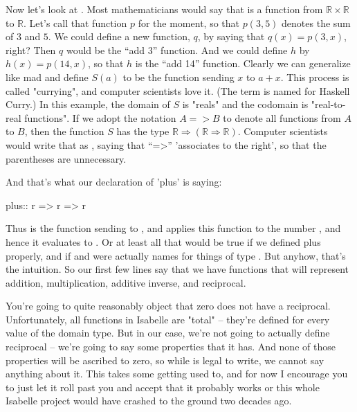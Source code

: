 Now let's look at . Most mathematicians would say that  is a function from $\mathbb R \times \mathbb R$ to $\mathbb R$.  Let's call that function $p$ for the moment, so that $p(3, 5)$ denotes the sum of $3$ and $5$. We could define a new function, $q$, by saying that $q(x) = p(3, x)$, right? Then $q$ would be the ``add 3'' function. And we could define $h$ by $h(x) = p(14, x)$, so that $h$ is the ``add 14'' function. Clearly we can generalize like mad and define $S(a)$ to be the function sending $x$ to $a + x$. This process is called "currying", and computer scientists love it. (The term is named for Haskell Curry.) In this example, the domain of $S$ is "reals" and the codomain is "real-to-real functions". If we adopt the notation $A => B$ to denote all functions from $A$ to $B$, then the function $S$ has the type
$\mathbb R \Rightarrow (\mathbb R \Rightarrow \mathbb R) $. Computer scientists would write that as , saying that ``=>'' 'associates to the right', so that the parentheses are unnecessary. 

And that's what our declaration of 'plus' is saying: 
\begin{IS}
plus:: r => r => r
\end{IS}

Thus  is the function sending  to , and  applies this function to the number , and hence it evaluates to . Or at least all that would be true if we defined plus properly, and if  and  were actually names for things of type . But anyhow, that's the intuition. So our first few lines say that we have functions that will represent addition, multiplication, additive inverse, and reciprocal. 

You're going to quite reasonably object that zero does not have a reciprocal. Unfortunately, all functions in Isabelle are "total" -- they're defined for every value of the domain type. But in our case, we're not going to actually define reciprocal -- we're going to say some properties that it has. And none of those properties will be ascribed to zero, so while  is legal to write, we cannot say anything about it. This takes some getting used to, and for now I encourage you to just let it roll past you and accept that it probably works or this whole Isabelle project would have crashed to the ground two decades ago. 

